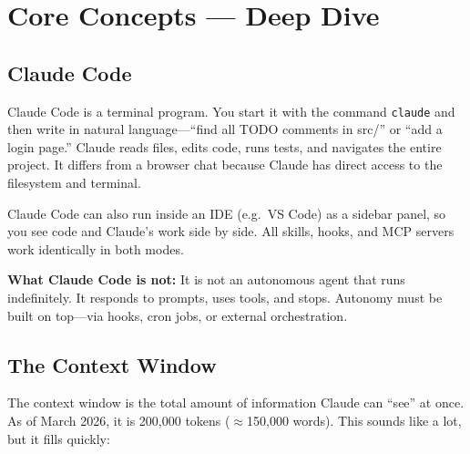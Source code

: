 \documentclass[11pt,a4paper]{article}
\begin{document}
\newpage

\section{Core Concepts --- Deep Dive}

\subsection{Claude Code}

Claude Code is a terminal program. You start it with the command \texttt{claude} and then write in natural language---``find all TODO comments in src/'' or ``add a login page.'' Claude reads files, edits code, runs tests, and navigates the entire project. It differs from a browser chat because Claude has direct access to the filesystem and terminal.

Claude Code can also run inside an IDE (e.g.\ VS Code) as a sidebar panel, so you see code and Claude's work side by side. All skills, hooks, and MCP servers work identically in both modes.

\textbf{What Claude Code is not:} It is not an autonomous agent that runs indefinitely. It responds to prompts, uses tools, and stops. Autonomy must be built on top---via hooks, cron jobs, or external orchestration.

\subsection{The Context Window}
\label{sec:context-window}

The context window is the total amount of information Claude can ``see'' at once. As of March 2026, it is 200,000 tokens ($\approx$150,000 words). This sounds like a lot, but it fills quickly:
\end{document}
